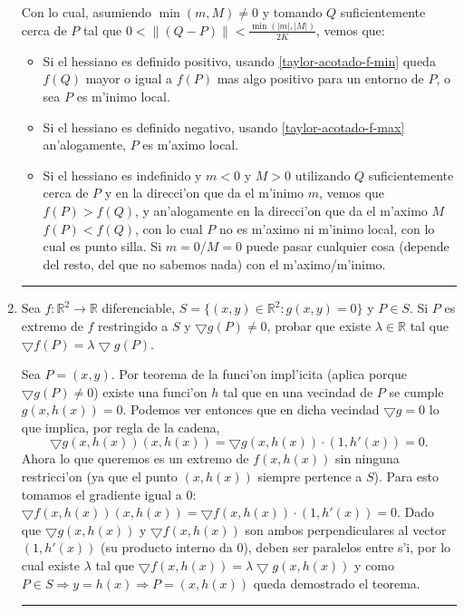\documentclass[a4paper,spanish]{article}
\newcommand{\R}[0]{\mathbb{R}}
\newcommand{\norma}[1]{\left\|#1\right\|}
\newcommand{\grad}[0]{\bigtriangledown}
\newcommand{\lthen}[0]{\Rightarrow}
\newenvironment{demo}{{\noindent \textbf{Demo: }}}{\hfill\rule{2mm}{2mm}\par}
\begin{document}
\begin{enumerate}
\begin{demo}
Con lo cual, asumiendo $\min(m,M) \neq 0$ y tomando $Q$ suficientemente 
cerca de $P$ tal que $0 < \norma{(Q-P)} < \frac{\min(|m|,|M|)}{2K}$, vemos que:
\begin{itemize}
\item Si el hessiano es definido positivo, usando \ref{taylor-acotado-f-min}
queda $f(Q)$ mayor o igual a $f(P)$ mas algo positivo para un entorno de $P$,
o sea $P$ es m'inimo local.
\item Si el hessiano es definido negativo, usando \ref{taylor-acotado-f-max}
an'alogamente, $P$ es m'aximo local.
\item Si el hessiano es indefinido y $m < 0$ y $M > 0$ utilizando $Q$
suficientemente cerca de $P$ y en la direcci'on que da el m'inimo $m$, vemos
que $f(P) > f(Q)$, y an'alogamente en la direcci'on que da el m'aximo $M$
$f(P) < f(Q)$, con lo cual $P$ no es m'aximo ni m'inimo local, con lo cual
es punto silla. Si $m=0$/$M=0$ puede pasar cualquier cosa (depende del resto, 
del que no sabemos nada) con el m'aximo/m'inimo.
\end{itemize}
\end{demo}

\item Sea $f : \R^2 \to \R$ diferenciable, 
$S = \{(x,y) \in \R^2 : g(x,y) = 0\}$ y $P \in S$. Si $P$ es extremo de $f$
restringido a $S$ y $\grad g(P) \neq 0$, probar que existe $\lambda \in \R$
tal que $\grad f(P) = \lambda \grad g(P)$.

\begin{demo}
Sea $P = (x,y)$. Por teorema de la funci'on impl'icita (aplica porque 
$\grad g(P) \neq 0$) existe una funci'on $h$ tal que en una vecindad de $P$ se
cumple $g(x,h(x)) = 0$. Podemos ver entonces que en dicha vecindad 
$\grad g = 0$ lo que implica, por regla de la cadena,
$$\grad g(x,h(x))(x,h(x)) = \grad g(x,h(x)) \cdot (1, h'(x)) = 0.$$
Ahora lo que queremos es un extremo de $f(x,h(x))$ sin ninguna restricci'on
(ya que el punto $(x,h(x))$ siempre pertence a $S$). Para esto tomamos el 
gradiente igual a $0$: $\grad f(x,h(x))(x,h(x)) = 
	\grad f(x,h(x)) \cdot (1, h'(x)) = 0$.
Dado que $\grad g(x,h(x))$ y $\grad f(x,h(x))$ son ambos perpendiculares al
vector $(1,h'(x))$ (su producto interno da $0$), deben ser paralelos entre s'i,
por lo cual existe $\lambda$ tal que 
$\grad f(x,h(x)) = \lambda \grad g(x,h(x))$ y como $P \in S \lthen y = h(x) 
\lthen P = (x,h(x))$ queda demostrado el teorema.
\end{demo}

\end{enumerate}
\end{document}
